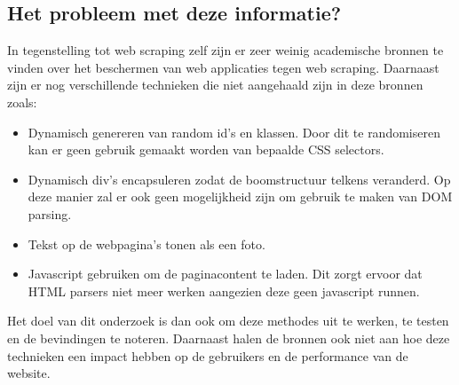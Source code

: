 \subsection{Het probleem met deze informatie?}
In tegenstelling tot web scraping zelf zijn er zeer weinig academische bronnen te vinden over het beschermen van web applicaties tegen web scraping. Daarnaast zijn er nog verschillende technieken die niet aangehaald zijn in deze bronnen zoals:
\\
\begin{itemize}
\item Dynamisch genereren van random id's en klassen. Door dit te randomiseren kan er geen gebruik gemaakt worden van bepaalde CSS selectors.
\item Dynamisch div's encapsuleren zodat de boomstructuur telkens veranderd. Op deze manier zal er ook geen mogelijkheid zijn om gebruik te maken van DOM parsing.
\item Tekst op de webpagina's tonen als een foto.
\item Javascript gebruiken om de paginacontent te laden. Dit zorgt ervoor dat HTML parsers niet meer werken aangezien deze geen javascript runnen.
\end{itemize}

Het doel van dit onderzoek is dan ook om deze methodes uit te werken, te testen en de bevindingen te noteren. Daarnaast halen de bronnen ook niet aan hoe deze technieken een impact hebben op de gebruikers en de performance van de website.



